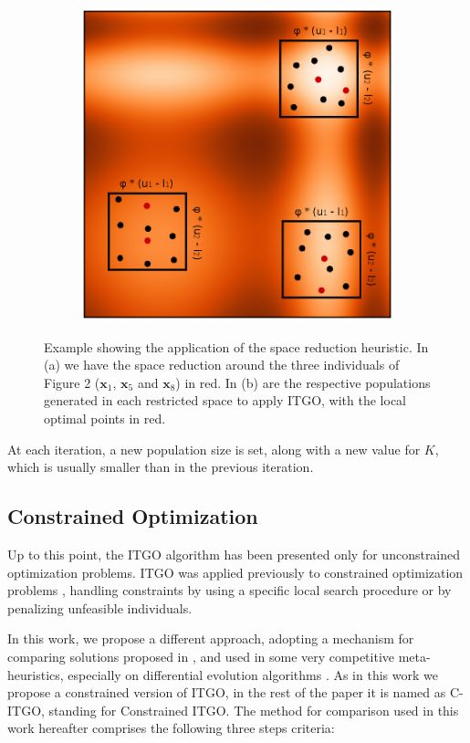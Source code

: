 \begin{figure}[tp]
\begin{subfigure}{.5\textwidth}
  \includegraphics[width=1.1\linewidth]{img/Topo/fig_3.eps}
  \caption{}
  \label{fig:SpaceReduction-b}
\end{subfigure}
\caption{Example showing the application of the space reduction heuristic. In (a) we have the space reduction around the three individuals of Figure 2 ($\bm{x}_1$, $\bm{x}_5$ and $\bm{x}_8$) in red. In (b) are the respective populations generated in each restricted space to apply ITGO, with the local optimal points in red.}\label{fig:SpaceReduction}
\end{figure}


At each iteration, a new population size is set, along with a new value for $K$, which is usually smaller than in the previous iteration.


\subsection{Constrained Optimization}

Up to this point, the ITGO algorithm has been presented only for unconstrained optimization problems. ITGO was applied previously to constrained optimization problems \citep{ITGO2, ITGO3}, handling constraints by using a specific local search procedure or by penalizing unfeasible individuals.

In this work, we propose a different approach, adopting a mechanism for comparing solutions proposed in \cite{ConHandling}, and used in some very competitive meta-heuristics, especially on differential evolution algorithms \citep{DE1, DE2, DE3}. As in this work we propose a constrained version of ITGO, in the rest of the paper it is named as C-ITGO, standing for Constrained ITGO. The method for comparison used in this work hereafter comprises the following three steps criteria:

